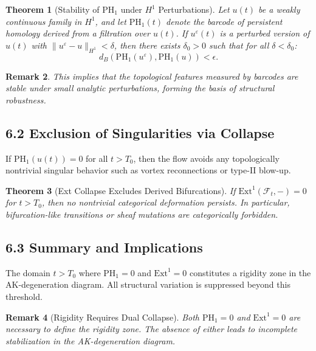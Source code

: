 \documentclass[11pt]{article}
\newtheorem{theorem}{Theorem}[section]
\newtheorem{remark}[theorem]{Remark}
\begin{document}
\begin{theorem}[Stability of PH$_1$ under $H^1$ Perturbations]
Let $u(t)$ be a weakly continuous family in $H^1$, and let $\mathrm{PH}_1(t)$ denote the barcode of persistent homology derived from a filtration over $u(t)$. If $u^\varepsilon(t)$ is a perturbed version of $u(t)$ with $\|u^\varepsilon - u\|_{H^1} < \delta$, then there exists $\delta_0 > 0$ such that for all $\delta < \delta_0$:
\[
d_B(\mathrm{PH}_1(u^\varepsilon), \mathrm{PH}_1(u)) < \epsilon.
\]
\end{theorem}

\begin{remark}
This implies that the topological features measured by barcodes are stable under small analytic perturbations, forming the basis of structural robustness.
\end{remark}

\subsection{6.2 Exclusion of Singularities via Collapse}

\begin{proposition}
If $\mathrm{PH}_1(u(t)) = 0$ for all $t > T_0$, then the flow avoids any topologically nontrivial singular behavior such as vortex reconnections or type-II blow-up.
\end{proposition}

\begin{theorem}[Ext Collapse Excludes Derived Bifurcations]
If $\mathrm{Ext}^1(\mathcal{F}_t, -) = 0$ for $t > T_0$, then no nontrivial categorical deformation persists. In particular, bifurcation-like transitions or sheaf mutations are categorically forbidden.
\end{theorem}

\subsection{6.3 Summary and Implications}

\begin{corollary}
The domain $t > T_0$ where $\mathrm{PH}_1 = 0$ and $\mathrm{Ext}^1 = 0$ constitutes a rigidity zone in the AK-degeneration diagram. All structural variation is suppressed beyond this threshold.
\end{corollary}

\begin{remark}[Rigidity Requires Dual Collapse]
Both $\mathrm{PH}_1 = 0$ and $\mathrm{Ext}^1 = 0$ are necessary to define the rigidity zone. The absence of either leads to incomplete stabilization in the AK-degeneration diagram.
\end{remark}
\end{document}
